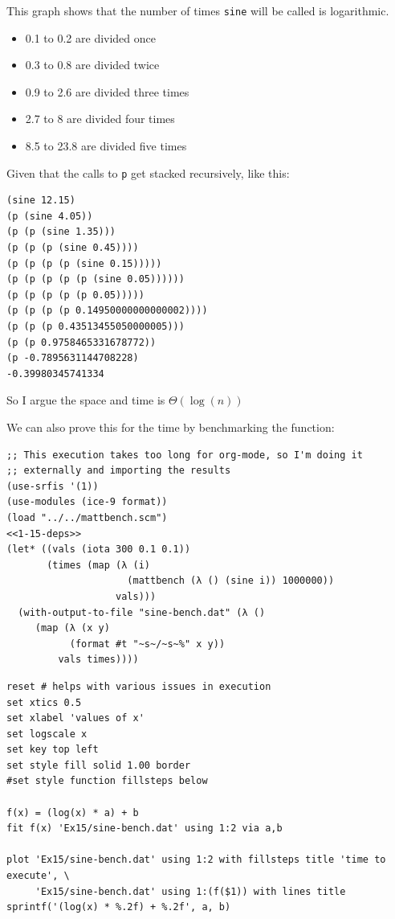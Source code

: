 \documentclass[final,fleqn,titlepage]{article}
\begin{document}
This graph shows that the number of times \texttt{sine} will be called is logarithmic.
\begin{itemize}
\item 0.1 to 0.2 are divided once
\item 0.3 to 0.8 are divided twice
\item 0.9 to 2.6 are divided three times
\item 2.7 to 8 are divided four times
\item 8.5 to 23.8 are divided five times
\end{itemize}

Given that the calls to \texttt{p} get stacked recursively, like this:
\begin{verbatim}
(sine 12.15)
(p (sine 4.05))
(p (p (sine 1.35)))
(p (p (p (sine 0.45))))
(p (p (p (p (sine 0.15)))))
(p (p (p (p (p (sine 0.05))))))
(p (p (p (p (p 0.05)))))
(p (p (p (p 0.14950000000000002))))
(p (p (p 0.43513455050000005)))
(p (p 0.9758465331678772))
(p -0.7895631144708228)
-0.39980345741334
\end{verbatim}

So I argue the space and time is \(\Theta(\log(n))\)


We can also prove this for the time by benchmarking the function:

\begin{verbatim}
;; This execution takes too long for org-mode, so I'm doing it
;; externally and importing the results
(use-srfis '(1))
(use-modules (ice-9 format))
(load "../../mattbench.scm")
<<1-15-deps>>
(let* ((vals (iota 300 0.1 0.1))
       (times (map (λ (i)
                     (mattbench (λ () (sine i)) 1000000))
                   vals)))
  (with-output-to-file "sine-bench.dat" (λ ()
     (map (λ (x y)
           (format #t "~s~/~s~%" x y))
         vals times))))
\end{verbatim}

\begin{verbatim}
reset # helps with various issues in execution
set xtics 0.5
set xlabel 'values of x'
set logscale x
set key top left
set style fill solid 1.00 border
#set style function fillsteps below

f(x) = (log(x) * a) + b
fit f(x) 'Ex15/sine-bench.dat' using 1:2 via a,b

plot 'Ex15/sine-bench.dat' using 1:2 with fillsteps title 'time to execute', \
     'Ex15/sine-bench.dat' using 1:(f($1)) with lines title sprintf('(log(x) * %.2f) + %.2f', a, b)
\end{verbatim}
\end{document}
